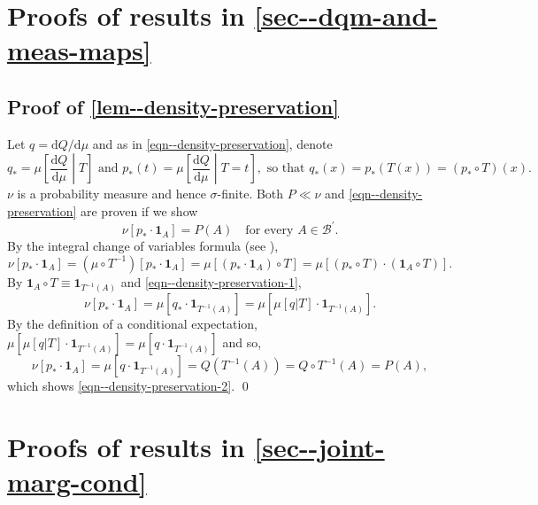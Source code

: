 \documentclass[12pt]{article}
\let\Cref\autoref
\def\ind{\mathbf{1}}
\theoremstyle{definition}
\theoremstyle{plain}
\begin{document}
\section{Proofs of results in \Cref{sec--dqm-and-meas-maps}}

\subsection{Proof of \Cref{lem--density-preservation}}
\label{sec--prf--lem--density-preservation}

Let \(q = \mathrm{d} Q / \mathrm{d} \mu\) and as in
\eqref{eqn--density-preservation}, denote
\begin{equation}
  q_{\ast} = \mu \left[ \frac{\mathrm{d} Q}{\mathrm{d} \mu} \middle| T \right]
  \text{ and } p_{\ast} (t) = \mu \left[ \frac{\mathrm{d}
  Q}{\mathrm{d} \mu} \middle| T = t \right], \text{ so that } q_{\ast} (x) =
  p_{\ast} (T (x)) = \left( p_{\ast} \circ T \right) (x).
  \label{eqn--density-preservation-1}
\end{equation}
\(\nu\) is a probability measure and hence \(\sigma\)-finite.
Both \(P \ll \nu\) and \eqref{eqn--density-preservation} are proven if we show
\begin{equation}
  \nu \left[ p_{\ast} \cdot \ind_{A} \right] = P (A) \quad \text{for
  every } A \in \mathcal{B}^{\prime}.
  \label{eqn--density-preservation-2}
\end{equation}
By the integral change of variables formula
(see \citet[Theorem 3.6.1]{2007bogachevMeasureTheory}),
\begin{equation*}
  \nu \left[ p_{\ast} \cdot \ind_{A} \right] = (\mu \circ T^{- 1}) \left[
  p_{\ast} \cdot \ind_{A} \right] = \mu \left[ \left( p_{\ast} \cdot
  \ind_{A} \right) \circ T \right] = \mu \left[ \left( p_{\ast} \circ T
  \right) \cdot \left( \ind_{A} \circ T \right) \right].
\end{equation*}
By \(\ind_{A} \circ T \equiv \ind_{T^{- 1} (A)}\) and
\eqref{eqn--density-preservation-1},
\begin{equation*}
  \nu \left[ p_{\ast} \cdot \ind_{A} \right] = \mu \left[ q_{\ast}
  \cdot \ind_{T^{- 1} (A)} \right] = \mu \left[ \mu [q | T] \cdot
  \ind_{T^{- 1} (A)} \right].
\end{equation*}
By the definition of a conditional expectation,
\(\mu \left[ \mu [q | T] \cdot \ind_{T^{- 1} (A)} \right] = \mu \left[ q
\cdot \ind_{T^{- 1} (A)} \right]\) and so,
\begin{equation*}
  \nu \left[ p_{\ast} \cdot \ind_{A} \right] =
  \mu \left[ q \cdot \ind_{T^{- 1} (A)} \right] = Q \left( T^{- 1}
  (A) \right) = Q \circ T^{- 1} (A) =
  P (A),
\end{equation*}
which shows \eqref{eqn--density-preservation-2}.
\qed

\section{Proofs of results in \Cref{sec--joint-marg-cond}}
\end{document}
